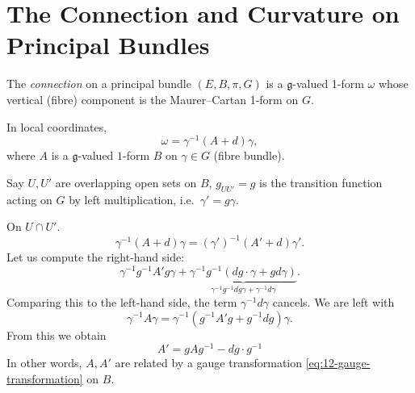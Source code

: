 
\section{The Connection and Curvature on Principal Bundles}%
\label{sec:the_connection_and_curvature_on_principal_bundles}

\begin{definition}[connection]
  The \emph{connection} on a principal bundle $(E, B, \pi, G)$ is a $\mathfrak{g}$-valued 1-form $\omega$ whose vertical (fibre) component is the Maurer--Cartan 1-form on $G$.
\end{definition}
In local coordinates,
\begin{equation}
  \omega = \gamma^{-1} (A + d) \gamma,
\end{equation}
where $A$ is a $\mathfrak{g}$-valued $1$-form $B$ on $\gamma \in G$ (fibre bundle).

Say $U, U'$ are overlapping open sets on $B$, $g_{U U'} = g$ is the transition function acting on $G$ by left multiplication, i.e.~$\gamma' = g \gamma$.

On $U \cap U'$.
\begin{equation}
  \gamma^{-1} (A + d) \gamma = (\gamma')^{-1} (A' + d) \gamma'.
\end{equation}
Let us compute the right-hand side:
\begin{equation}
  \gamma^{-1} g^{-1} A' g \gamma + \underbrace{\gamma^{-1} g^{-1} (d g \cdot \gamma + g d \gamma)}_{\gamma^{-1} g^{-1} d g \gamma + \gamma^{-1} d \gamma}.
\end{equation}
Comparing this to the left-hand side, the term $\gamma^{-1} d \gamma$ cancels. We are left with
\begin{equation}
  \gamma^{-1} A \gamma = \gamma^{-1} (g^{-1} A' g + g^{-1} d g) \gamma.
\end{equation}
From this we obtain
\begin{equation}
  \boxed{A' = g A g^{-1} - dg \cdot g^{-1}}
\end{equation}
In other words, $A, A'$ are related by a gauge transformation \eqref{eq:12-gauge-transformation} on $B$.


